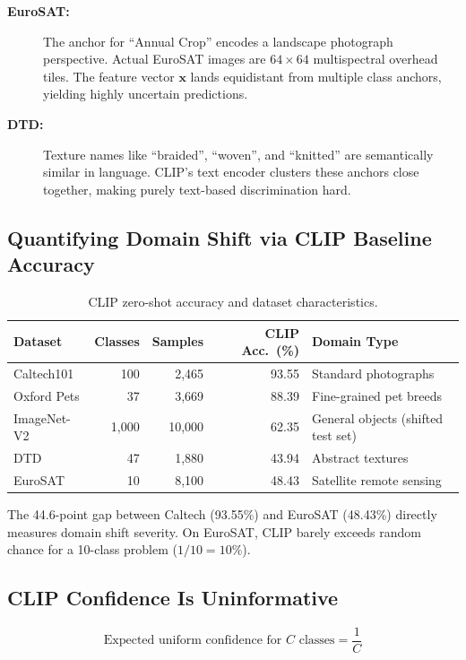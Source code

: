 \documentclass[12pt,a4paper]{article}
\newcommand{\bx}{\mathbf{x}}
\newcommand{\1}{\mathbf{1}}
\begin{document}
\begin{description}
  \item[\textbf{EuroSAT:}] The anchor for ``Annual Crop'' encodes a landscape photograph perspective.
  Actual EuroSAT images are $64\times64$ multispectral overhead tiles.
  The feature vector $\bx$ lands equidistant from multiple class anchors, yielding highly uncertain predictions.

  \item[\textbf{DTD:}] Texture names like ``braided'', ``woven'', and ``knitted'' are semantically similar in language.
  CLIP's text encoder clusters these anchors close together, making purely text-based discrimination hard.
\end{description}

\subsection{Quantifying Domain Shift via CLIP Baseline Accuracy}

\begin{table}[H]
\centering
\caption{CLIP zero-shot accuracy and dataset characteristics.}
\label{tab:clip_baseline}
\begin{tabular}{@{}lrrrl@{}}
\toprule
Dataset & Classes & Samples & CLIP Acc.\ (\%) & Domain Type \\
\midrule
Caltech101  & 100   & 2,465  & 93.55 & Standard photographs \\
Oxford Pets & 37    & 3,669  & 88.39 & Fine-grained pet breeds \\
ImageNet-V2 & 1,000 & 10,000 & 62.35 & General objects (shifted test set) \\
DTD         & 47    & 1,880  & 43.94 & Abstract textures \\
EuroSAT     & 10    & 8,100  & 48.43 & Satellite remote sensing \\
\bottomrule
\end{tabular}
\end{table}

The 44.6-point gap between Caltech (93.55\%) and EuroSAT (48.43\%) directly measures domain shift severity.
On EuroSAT, CLIP barely exceeds random chance for a 10-class problem ($1/10 = 10\%$).

\subsection{CLIP Confidence Is Uninformative}

\begin{equation}
  \text{Expected uniform confidence for $C$ classes} = \frac{1}{C}
\end{equation}
\end{document}
